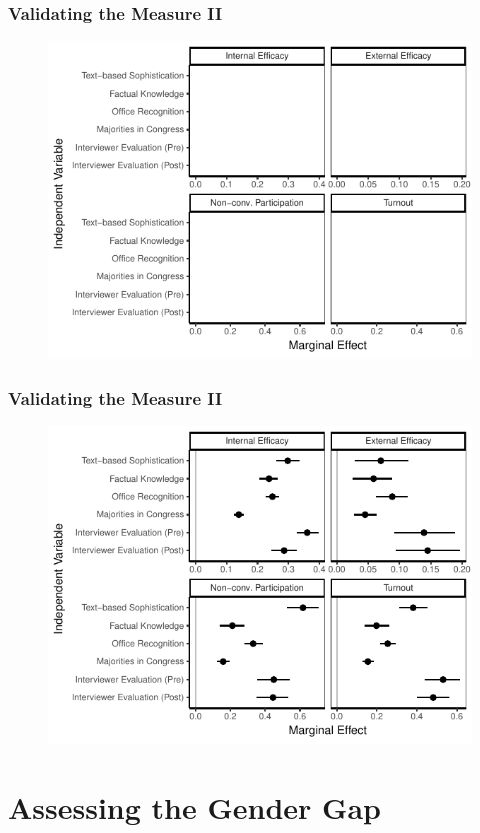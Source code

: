 \documentclass{beamer}
\begin{document}
\begin{frame} %
\frametitle{Validating the Measure II}
  \begin{figure}
  \includegraphics[height = .8\textheight]{../fig/knoweff_empty.pdf}
  \end{figure}
\end{frame}
\begin{frame} %
\frametitle{Validating the Measure II}
  \begin{figure}
  \includegraphics[height = .8\textheight]{../fig/knoweff.pdf}
  \end{figure}
\end{frame}


\section{Assessing the Gender Gap}
\end{document}
